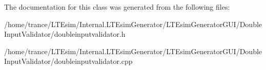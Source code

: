 The documentation for this class was generated from the following files\+:\begin{DoxyCompactItemize}
\item 
/home/trance/\+L\+T\+Esim/\+Internal.\+L\+T\+Esim\+Generator/\+L\+T\+Esim\+Generator\+G\+U\+I/\+Double\+Input\+Validator/doubleinputvalidator.\+h\item 
/home/trance/\+L\+T\+Esim/\+Internal.\+L\+T\+Esim\+Generator/\+L\+T\+Esim\+Generator\+G\+U\+I/\+Double\+Input\+Validator/doubleinputvalidator.\+cpp\end{DoxyCompactItemize}
